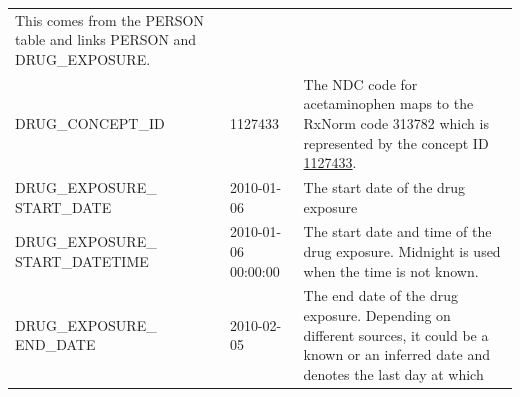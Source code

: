\documentclass[11pt]{book}
\begin{document}
\begin{longtable}[]{@{}lll@{}}
\begin{minipage}[t]{0.47\columnwidth}
This comes from the PERSON table and links PERSON and
DRUG\_EXPOSURE.\strut
\end{minipage}\tabularnewline
\begin{minipage}[t]{0.30\columnwidth}\raggedright\strut
DRUG\_CONCEPT\_ID\strut
\end{minipage} & \begin{minipage}[t]{0.14\columnwidth}\raggedright\strut
1127433\strut
\end{minipage} & \begin{minipage}[t]{0.47\columnwidth}\raggedright\strut
The NDC code for acetaminophen maps to the RxNorm code 313782 which is
represented by the concept ID
\href{http://athena.ohdsi.org/search-terms/terms/1127433}{1127433}.\strut
\end{minipage}\tabularnewline
\begin{minipage}[t]{0.30\columnwidth}\raggedright\strut
DRUG\_EXPOSURE\_ START\_DATE\strut
\end{minipage} & \begin{minipage}[t]{0.14\columnwidth}\raggedright\strut
2010-01-06\strut
\end{minipage} & \begin{minipage}[t]{0.47\columnwidth}\raggedright\strut
The start date of the drug exposure\strut
\end{minipage}\tabularnewline
\begin{minipage}[t]{0.30\columnwidth}\raggedright\strut
DRUG\_EXPOSURE\_ START\_DATETIME\strut
\end{minipage} & \begin{minipage}[t]{0.14\columnwidth}\raggedright\strut
2010-01-06 00:00:00\strut
\end{minipage} & \begin{minipage}[t]{0.47\columnwidth}\raggedright\strut
The start date and time of the drug exposure. Midnight is used when the
time is not known.\strut
\end{minipage}\tabularnewline
\begin{minipage}[t]{0.30\columnwidth}\raggedright\strut
DRUG\_EXPOSURE\_ END\_DATE\strut
\end{minipage} & \begin{minipage}[t]{0.14\columnwidth}\raggedright\strut
2010-02-05\strut
\end{minipage} & \begin{minipage}[t]{0.47\columnwidth}\raggedright\strut
The end date of the drug exposure. Depending on different sources, it
could be a known or an inferred date and denotes the last day at which

\end{minipage}
\end{longtable}
\end{document}
